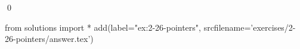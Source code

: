 
\begin{ex}
  \label{ex:2-26-pointers}
  
  \qed
\end{ex}
\begin{python0}
from solutions import *
add(label="ex:2-26-pointers",
    srcfilename='exercises/2-26-pointers/answer.tex')
\end{python0}
